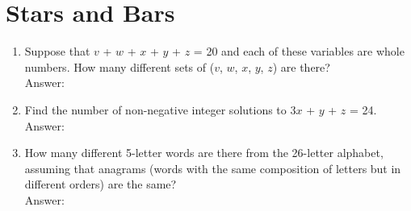 \documentclass[12pt]{extarticle}
\begin{document}
\section{Stars and Bars}
\begin{enumerate}
    \itemsep 2.0em
    \item {Suppose that $v$ + $w$ + $x$ + $y$ + $z$ = 20 and each of these variables are whole numbers. How many different sets of ($v$, $w$, $x$, $y$, $z$) are there? \\Answer: }
    \item {Find the number of non-negative integer solutions to $3x$ + $y$ + $z$ = 24. \\Answer: }
    \item {How many different 5-letter words are there from the 26-letter alphabet, assuming that anagrams (words with the same composition of letters but in different orders) are the same? \\Answer: }
\end{enumerate}
\end{document}
